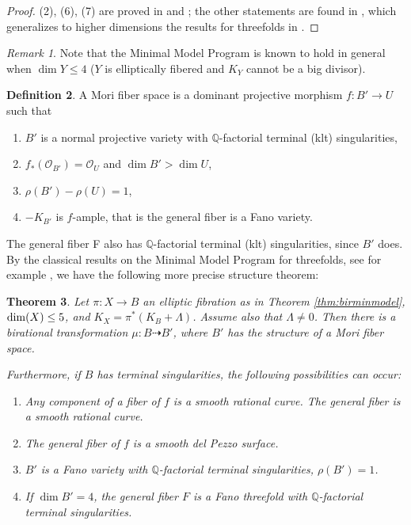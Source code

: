 \documentclass[11pt]{amsart}
\newtheorem{theorem}{Theorem}[section]
\theoremstyle{definition}
\newtheorem{definition}[theorem]{Definition}
\theoremstyle{definition}
\theoremstyle{remark}
\newtheorem{remark}[theorem]{Remark}
\theoremstyle{remark}
\theoremstyle{definition}
\theoremstyle{conjecture}
\begin{document}
\begin{proof} (2), (6), (7) are  proved in  \cite{Grassi1991} and \cite{GrassiSingBase1993}; the other statements  are found in  \cite{GrassiWen}, which generalizes to higher dimensions the results for threefolds in \cite{Grassi1991, GrassiEqui}. \end{proof}
\begin{remark}{Note that the Minimal Model Program is known to hold  in general when  $\dim Y \leq 4$  ($Y$ is elliptically fibered and $K_Y$ cannot be  a big divisor).}
\end{remark}

\begin{definition}\label{def:MoriFS} A {Mori fiber space} is a  dominant  projective morphism
$
f : B' \to U$
such that
\begin{enumerate}[(\alph*)]
\item $B'$ is a normal projective variety with $\mathbb{Q}$-factorial terminal (klt) singularities,
\item $ f_*(\mathcal O_{B'})= \mathcal O_U$ and $\dim B '> \dim U$,
\item $ \rho(B')- \rho(U)=1$,
\item  $-K_{B'}$ is $f$-ample, that is the general fiber is a Fano variety.
\end{enumerate}
\end{definition}
The general fiber F also has ${\mathbb Q}$-factorial terminal (klt)
singularities, since $B'$ does.
By the classical results on the Minimal Model Program for threefolds, see for example \cite{MatsukiIntroMMP}, we have the following more precise structure theorem:

\begin{theorem}\label{thm:MMP} Let $\pi: X \to B$ an elliptic fibration as in Theorem \ref{thm:birminmodel},  ${\rm dim}(X) \leq 5$, and  $K_X= \pi^*(K_B+ \Lambda)$. Assume also  that $ \Lambda \neq 0$. Then there is a birational transformation $\mu: B \dasharrow B'$, where $B'$ 
has the structure of a Mori fiber space. 

Furthermore, if $B$ has terminal singularities, the following possibilities can occur:
\begin{enumerate}
\item   Any component of a fiber of $f$ is a smooth rational curve. The general fiber is a smooth rational curve.
\item The general fiber of $f$ is a smooth del Pezzo surface.
\item  $B'$ is a Fano  variety with $\mathbb{Q}$-factorial terminal singularities, $\rho (B')=1$.
\item If $\dim B'=4$, the general fiber $F$ is a Fano threefold with $\mathbb{Q}$-factorial terminal singularities.
\end{enumerate}    
\end{theorem}
\end{document}
